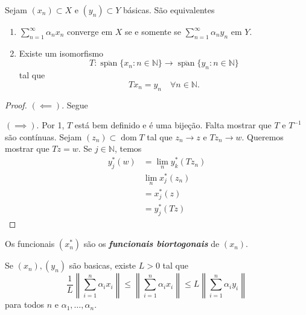 \documentclass[portuguese]{article}
\theoremstyle{definition}
\newcommand{\N}{\mathbb{N}}
\begin{document}
\begin{teo}
	Sejam $(x_n)\subset X$ e $(y_n)\subset Y$ básicas. São equivalentes
	\begin{enumerate}
		\item $\sum_{n=1}^\infty \alpha_nx_n$ converge em $X$ se e somente se $\sum_{n=1}^\infty\alpha_ny_n$ em $Y$.
		\item Existe um isomorfismo
		\[T:\overline{\operatorname{span}}\{x_n:n\in\N\}\to\overline{\operatorname{span}}\{y_n:n\in\N\}\]
		tal que
		\[Tx_n=y_n\quad\forall n\in\N.\]
	\end{enumerate}
\end{teo}
\begin{proof}
	$(\impliedby)$. Segue
	
	$(\implies)$. Por 1, $T$ está bem definido e é uma bijeção. Falta mostrar que $T$ e $T^{-1}$ são contínuas. Sejam $(z_n)\subset \operatorname{dom}T$ tal que $z_n\to z$ e $Tz_n\to w$. Queremos mostrar que $Tz=w$. Se $j\in\N$, temos
	\begin{align*}
		y^*_j(w)&=\lim_ny^*_k(Tz_n)\\
		&\lim_nx^*_j(z_n)\\
		&=x_j^*(z)\\
		&=y^*_j(Tz)
	\end{align*}
\end{proof}
\begin{defn}
	Os funcionais $(x_n^*)$ são os \textbf{\textit{funcionais biortogonais}} de $(x_n)$.
\end{defn}
\begin{coro}
	Se $(x_n),(y_n)$ são basicas, existe $L>0$ tal que
	\[\frac{1}{L}\left\|\sum_{i=1}^n\alpha_ix_i\right\|\leq\left\|\sum_{i=1}^n\alpha_ix_i\right\|\leq L\left\|\sum_{i=1}^n\alpha_iy_i\right\|\]
	para todos $n$ e $\alpha_1,\ldots,\alpha_n$.
\end{coro}
\end{document}
